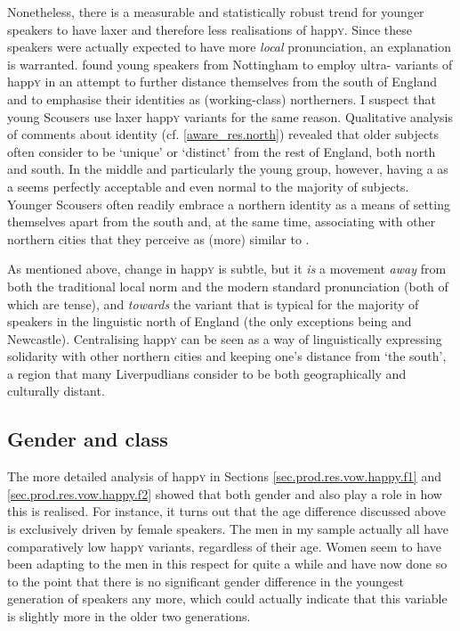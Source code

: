 Nonetheless, there is a measurable and statistically robust trend for younger speakers to have laxer and therefore less  realisations of happ\textsc{y}.
Since these speakers were actually expected to have more \emph{local} pronunciation, an explanation is warranted.
\textcite{flynn2010} found young speakers from Nottingham to employ ultra- variants of happ\textsc{y} in an attempt to further distance themselves from the south of England and to emphasise their identities as (working-class) northerners.
I suspect that young Scousers use laxer happ\textsc{y} variants for the same reason.
Qualitative analysis of comments about identity (cf. \ref{aware_res.north}) revealed that older subjects often consider  to be `unique' or `distinct' from the rest of England, both north and south.
In the middle and particularly the young group, however, having a  as a  seems perfectly acceptable and even normal to the majority of subjects.
Younger Scousers often readily embrace a northern identity as a means of setting themselves apart from the south and, at the same time, associating with other northern cities that they perceive as (more) similar to .

As mentioned above, change in happ\textsc{y} is subtle, but it \emph{is} a movement \emph{away} from both the traditional local norm and the modern standard pronunciation (both of which are tense), and \emph{towards} the variant that is typical for the majority of speakers in the linguistic north of England (the only exceptions being  and Newcastle).
Centralising happ\textsc{y} can be seen as a way of linguistically expressing solidarity with other northern cities and keeping one's distance from `the south', a region that many Liverpudlians consider to be both geographically and culturally distant.

\subsection{Gender and class}
\label{prod.disc.happy.social}

The more detailed analysis of happ\textsc{y} in Sections \ref{sec.prod.res.vow.happy.f1} and \ref{sec.prod.res.vow.happy.f2} showed that both gender and  also play a role in how this  is realised.
For instance, it turns out that the age difference discussed above is exclusively driven by female speakers.
The men in my sample actually all have comparatively low happ\textsc{y} variants, regardless of their age.
Women seem to have been adapting to the men in this respect for quite a while and have now done so to the point that there is no significant gender difference in the youngest generation of speakers any more, which could actually indicate that this variable is slightly more  in the older two generations.

